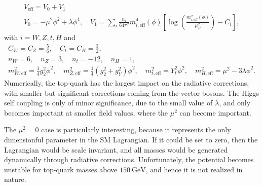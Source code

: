 \begin{equation}
\begin{gathered}
V_\text{eff} = V_0 + V_1\\
V_0 = - \mu^2 \phi^2 + \lambda \phi^4, \quad V_1 = \sum_{i} \frac{n_i}{64 \pi^2} m_{i, \text{eff}}^4(\phi) \left[ \log\! \left( \frac{m_{i, \text{eff}}^2 (\phi)}{\mu_R^2} \right) - C_i \right],
\end{gathered}
\end{equation}
with $i = W,Z, t, H$ and
\begin{equation}
\begin{gathered}
C_W = C_Z = \frac{5}{6}, \quad C_t = C_H = \frac{3}{2}, \\
n_W = 6, \quad n_Z = 3, \quad n_t = -12, \quad n_H = 1, \\
m_{W, \text{eff}}^2 = \frac{1}{4} g_2^2 \phi^2, \quad m_{Z, \text{eff}}^2 = \frac{1}{4} \left(g_2^2 + g_Y^2 \right) \phi^2, \quad m_{t, \text{eff}}^2 = Y_t^2 \phi^2, \quad m_{H, \text{eff}}^2 = \mu^2 - 3 \lambda \phi^2.
\end{gathered}
\label{eq:2:Veff_params}
\end{equation}
Numerically, the top-quark has the largest impact on the radiative corrections, with smaller but significant corrections coming from the vector bosons. The Higgs self coupling is only of minor significance, due to the small value of $\lambda$, and only becomes important at smaller field values, where the $\mu^2$ can become important.

The $\mu^2 = 0$ case is particularly interesting, because it represents the only dimensionful parameter in the \acs{SM} Lagrangian. If it could be set to zero, then the Lagrangian would be scale invariant, and all masses would be generated dynamically through radiative corrections. Unfortunately, the potential becomes unstable for top-quark masses above $150\ \mathrm{GeV}$, and hence it is not realized in nature.

